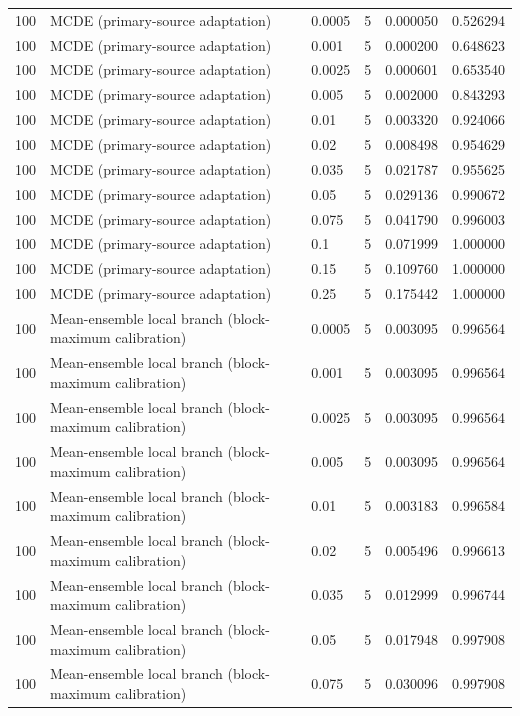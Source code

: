 \begin{tabular}{llllll}
100 & MCDE (primary-source adaptation) & 0.0005 & 5 & 0.000050 & 0.526294 \\
100 & MCDE (primary-source adaptation) & 0.001 & 5 & 0.000200 & 0.648623 \\
100 & MCDE (primary-source adaptation) & 0.0025 & 5 & 0.000601 & 0.653540 \\
100 & MCDE (primary-source adaptation) & 0.005 & 5 & 0.002000 & 0.843293 \\
100 & MCDE (primary-source adaptation) & 0.01 & 5 & 0.003320 & 0.924066 \\
100 & MCDE (primary-source adaptation) & 0.02 & 5 & 0.008498 & 0.954629 \\
100 & MCDE (primary-source adaptation) & 0.035 & 5 & 0.021787 & 0.955625 \\
100 & MCDE (primary-source adaptation) & 0.05 & 5 & 0.029136 & 0.990672 \\
100 & MCDE (primary-source adaptation) & 0.075 & 5 & 0.041790 & 0.996003 \\
100 & MCDE (primary-source adaptation) & 0.1 & 5 & 0.071999 & 1.000000 \\
100 & MCDE (primary-source adaptation) & 0.15 & 5 & 0.109760 & 1.000000 \\
100 & MCDE (primary-source adaptation) & 0.25 & 5 & 0.175442 & 1.000000 \\
100 & Mean-ensemble local branch (block-maximum calibration) & 0.0005 & 5 & 0.003095 & 0.996564 \\
100 & Mean-ensemble local branch (block-maximum calibration) & 0.001 & 5 & 0.003095 & 0.996564 \\
100 & Mean-ensemble local branch (block-maximum calibration) & 0.0025 & 5 & 0.003095 & 0.996564 \\
100 & Mean-ensemble local branch (block-maximum calibration) & 0.005 & 5 & 0.003095 & 0.996564 \\
100 & Mean-ensemble local branch (block-maximum calibration) & 0.01 & 5 & 0.003183 & 0.996584 \\
100 & Mean-ensemble local branch (block-maximum calibration) & 0.02 & 5 & 0.005496 & 0.996613 \\
100 & Mean-ensemble local branch (block-maximum calibration) & 0.035 & 5 & 0.012999 & 0.996744 \\
100 & Mean-ensemble local branch (block-maximum calibration) & 0.05 & 5 & 0.017948 & 0.997908 \\
100 & Mean-ensemble local branch (block-maximum calibration) & 0.075 & 5 & 0.030096 & 0.997908 \\

\end{tabular}
